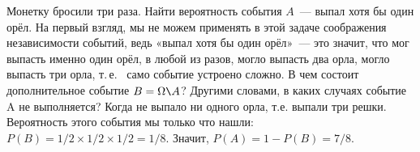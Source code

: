\documentclass[12pt,a4paper]{article}
\begin{document}
\begin{example}
	 Монетку бросили три раза. Найти вероятность события $A$~--- выпал хотя бы один орёл. На первый взгляд, мы не можем применять в этой задаче соображения независимости событий, ведь «выпал хотя бы один орёл»~--- это значит, что мог выпасть именно один орёл, в любой из разов, могло выпасть два орла, могло выпасть три орла, т.\,е.~ само событие устроено сложно. В чем состоит дополнительное событие $B=\Omega \verb|\| A $? Другими словами, в каких случаях событие A не выполняется? Когда не выпало ни одного орла, т.е. выпали три решки. Вероятность этого события мы только что нашли: $P(B)=1/2\times1/2\times1/2=1/8$. Значит, $P(A)=1-P(B)=7/8$.
\end{example}
\end{document}
